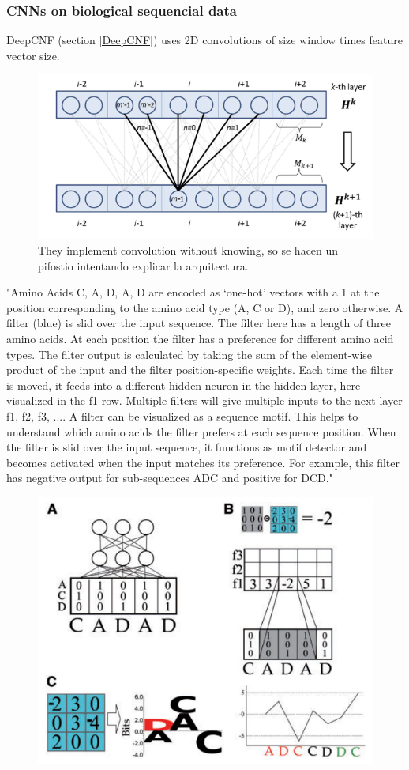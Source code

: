 \documentclass[]{scrartcl}
\begin{document}
\subsubsection{CNNs on biological sequencial data}
DeepCNF (section \ref{DeepCNF}) uses 2D convolutions of size window times feature vector size.
\begin{figure}[h]
	\centering
	\includegraphics[width=0.7\linewidth]{DeepCNF}
	\caption{They implement convolution without knowing, so se hacen un pifostio intentando explicar la arquitectura.}
\end{figure}

"Amino Acids C, A, D, A, D are encoded as ‘one-hot’ vectors with a 1 at the position corresponding to the amino acid type (A, C or D), and zero otherwise. A filter (blue) is slid over the input sequence. The filter here has a length of three amino acids. At each position the filter has a preference for different amino acid types. The filter output is calculated by taking the sum of the element-wise product of the input and the filter position-specific weights. Each time the filter is moved, it feeds into a different hidden neuron in the hidden layer, here visualized in the f1 row. Multiple filters will give multiple inputs to the next layer {f1, f2, f3, ...}. A filter can be visualized as a sequence motif. This helps to understand which amino acids the filter prefers at each sequence position. When the filter is slid over the input sequence, it functions as motif detector and becomes activated when the input matches its preference. For example, this filter has negative output for sub-sequences ADC and positive for DCD." \cite{Jurtz2017}
\begin{figure}[h]
\centering
\includegraphics[width=0.7\linewidth]{cnnbio}
\label{fig:cnnbio}
\end{figure}
\end{document}
